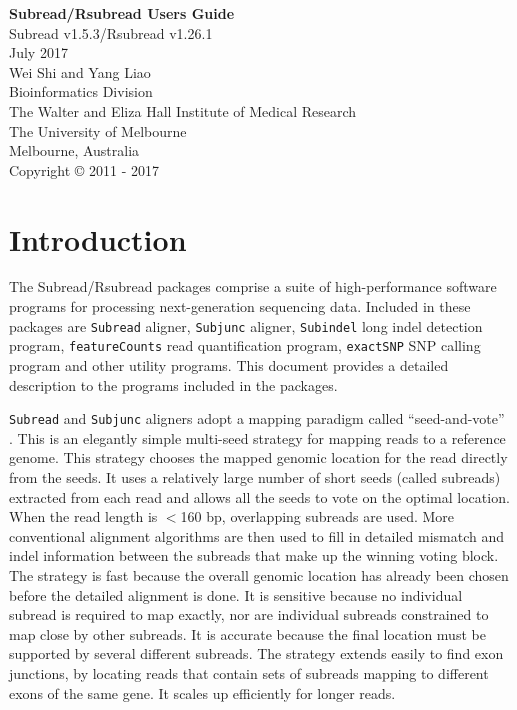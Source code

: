 \documentclass[12pt]{report}
\newcommand{\code}[1]{{\small\texttt{#1}}}
\begin{document}
\begin{titlepage}

\begin{center}
{\Huge\bf Subread/Rsubread Users Guide}\\
\vspace{1 cm}
{\centering\large Subread v1.5.3/Rsubread v1.26.1\\}
\vspace{1 cm}
 July 2017\\
\vspace{5 cm}
\Large Wei Shi and Yang Liao\\
\vspace{1 cm}
\small
{\large Bioinformatics Division\\
The Walter and Eliza Hall Institute of Medical Research\\
The University of Melbourne\\
Melbourne, Australia\\}
\vspace{7 cm}
\centering Copyright \small{\copyright}  2011 - 2017\\
\end{center}

\end{titlepage}

\tableofcontents

\chapter{Introduction}

The Subread/Rsubread packages comprise a suite of high-performance software programs for processing next-generation sequencing data.
Included in these packages are \code{Subread} aligner, \code{Subjunc} aligner, \code{Subindel} long indel detection program, \code{featureCounts} read quantification program, \code{exactSNP} SNP calling program and other utility programs.
This document provides a detailed description to the programs included in the packages.

\code{Subread} and \code{Subjunc} aligners adopt a mapping paradigm called ``seed-and-vote'' \cite{liao}.
This is an elegantly simple multi-seed strategy for mapping reads to a reference genome. 
This strategy chooses the mapped genomic location for the read directly from the seeds.
It uses a relatively large number of short seeds (called subreads) extracted from each read and allows all the seeds to vote on the optimal location.
When the read length is $<$160 bp, overlapping subreads are used.
More conventional alignment algorithms are then used to fill in detailed mismatch and indel information between the subreads that make up the winning voting block.
The strategy is fast because the overall genomic location has already been chosen before the detailed alignment is done.
It is sensitive because no individual subread is required to map exactly, nor are individual subreads constrained to map close by other subreads.
It is accurate because the final location must be supported by several different subreads. The strategy extends easily to find exon junctions, by locating reads that contain sets of subreads mapping to different exons of the same gene.
It scales up efficiently for longer reads.
\end{document}
